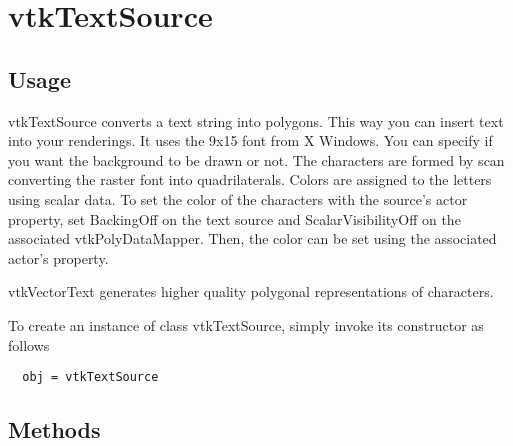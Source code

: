 \section{vtkTextSource}

\subsection{Usage}

 vtkTextSource converts a text string into polygons.  This way you can 
 insert text into your renderings. It uses the 9x15 font from X Windows.
 You can specify if you want the background to be drawn or not. The
 characters are formed by scan converting the raster font into
 quadrilaterals. Colors are assigned to the letters using scalar data.
 To set the color of the characters with the source's actor property, set
 BackingOff on the text source and ScalarVisibilityOff on the associated
 vtkPolyDataMapper. Then, the color can be set using the associated actor's
 property.

 vtkVectorText generates higher quality polygonal representations of
 characters.

To create an instance of class vtkTextSource, simply
invoke its constructor as follows
\begin{verbatim}
  obj = vtkTextSource
\end{verbatim}
\subsection{Methods}

